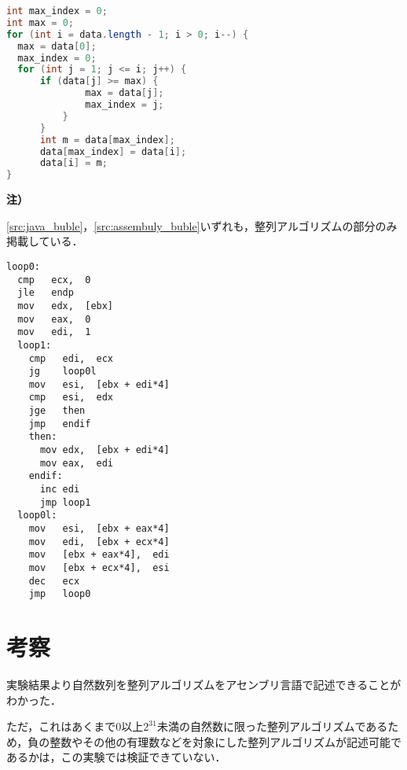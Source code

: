 \begin{minipage}[t]{0.5\linewidth}
    \centering
    \begin{lstlisting}[caption={{\ttfamily Java}で記述した選択ソート}, label={src:java_buble}, language={Java},frame={left}]
int max_index = 0;
int max = 0;
for (int i = data.length - 1; i > 0; i--) {
  max = data[0];
  max_index = 0;
  for (int j = 1; j <= i; j++) {
      if (data[j] >= max) {
              max = data[j];
              max_index = j;
          }
      }
      int m = data[max_index];
      data[max_index] = data[i];
      data[i] = m;
}
    \end{lstlisting}
    \begin{flushleft}
        \begin{framed}
            \noindent\textbf{注）}\par
            \ref{src:java_buble}，\ref{src:assembuly_buble}いずれも，整列アルゴリズムの部分のみ掲載している．
        \end{framed}
    \end{flushleft}
\end{minipage}
\hspace{3em}
\begin{minipage}[t]{0.4\linewidth}
    \begin{lstlisting}[frame={left},caption={アセンブリ言語で記述した選択ソート},label={src:assembuly_buble}]
loop0:
  cmp   ecx,  0
  jle   endp
  mov   edx,  [ebx]
  mov   eax,  0    
  mov   edi,  1
  loop1:
    cmp   edi,  ecx
    jg    loop0l
    mov   esi,  [ebx + edi*4]
    cmp   esi,  edx
    jge   then
    jmp   endif
    then:
      mov edx,  [ebx + edi*4]
      mov eax,  edi          
    endif:
      inc edi
      jmp loop1
  loop0l:
    mov   esi,  [ebx + eax*4]
    mov   edi,  [ebx + ecx*4]
    mov   [ebx + eax*4],  edi
    mov   [ebx + ecx*4],  esi
    dec   ecx
    jmp   loop0
\end{lstlisting}
\end{minipage}
\section{考察}
実験結果より自然数列を整列アルゴリズムをアセンブリ言語で記述できることがわかった．\par
ただ，これはあくまで\(0\)以上\(2^{31}\)未満の自然数に限った整列アルゴリズムであるため，負の整数やその他の有理数などを対象にした整列アルゴリズムが記述可能であるかは，この実験では検証できていない．